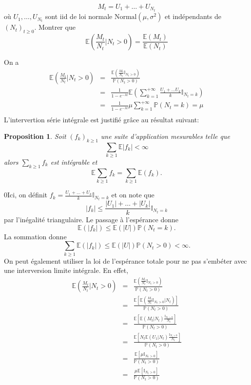 \documentclass[11pts]{exam}
\newcommand*{\Prob}{\mathbb{P}}
\newcommand*{\E}{\mathbb{E}}
\newtheorem{prop}{Proposition}
\newcommand*{\ind}{\mathbb{I}}
\begin{document}
\begin{questions}
\begin{parts}
$$
M_t = U_1+\ldots+  U_{N_t}
$$
où $U_1,\ldots, U_{N_t}$ sont iid de loi normale $\text{Normal}(\mu ,\sigma^2 )$ et indépendants de $(N_t)_{t\geq 0}$. Montrer que 
$$
\mathbb{E}\left(\frac{M_t}{N_t}\Big\rvert N_t>0\right) = \frac{\mathbb{E}(M_t)}{\mathbb{E}(N_t)}
$$
\begin{solution}
On a 
\begin{eqnarray*}
\mathbb{E}\left(\frac{M_t}{N_t}\Big\rvert N_t>0\right)&=& \frac{\mathbb{E}\left(\frac{M_t}{N_t}\mathbb{I}_{N_t>0}\right)}{\mathbb{P}(N_t>0)}\\
&=&\frac{1}{1-e^{-\lambda t}}\mathbb{E}\left(\sum_{k = 1}^{+\infty}\frac{U_1+\ldots U_k}{k}\mathbb{I}_{N_t=k}\right)\\
&=&\frac{1}{1-e^{-\lambda t}}\mu\sum_{k = 1}^{+\infty}\mathbb{P}(N_t=k)=\mu\\
\end{eqnarray*}
L'intervertion série intégrale est justifié grâce au résultat suivant:
\begin{prop}
Soit $(f_k)_{k\geq 1}$ une suite d'application mesurables telle que 
$$
\sum_{k\geq 1}\E|f_k|<\infty
$$
alors $\sum_{k\geq 1}f_k$ est intégrable et 
$$
\E\sum_{k\geq 1}f_k=\sum_{k\geq1}\E(f_k).
$$
\end{prop}
0Ici, on définit $f_k = \frac{U_1+\ldots+ U_k}{k}\ind_{N_t = k}$ et on note que 
$$
|f_k|\leq\frac{|U_1|+\ldots+ |U_k|}{k}\ind_{N_t = k}
$$
par l'inégalité triangulaire. Le passage à l'espérance donne 
$$
\E(|f_k|)\leq\E(|U|)\Prob(N_t = k).
$$
La sommation donne 
$$
\sum_{k\geq 1}\E(|f_k|)\leq\E(|U|)\Prob(N_t > 0)<\infty.
$$
On peut également utiliser la loi de l'espérance totale pour ne pas s'embéter avec une interversion limite intégrale. En effet, 
\begin{eqnarray*}
\mathbb{E}\left(\frac{M_t}{N_t}\Big\rvert N_t>0\right)&=& \frac{\mathbb{E}\left(\frac{M_t}{N_t}\mathbb{I}_{N_t>0}\right)}{\mathbb{P}(N_t>0)}\\
&=&\frac{\mathbb{E}\left[\mathbb{E}\left(\frac{M_t}{N_t}\mathbb{I}_{N_t>0}|N_t\right)\right]}{\mathbb{P}(N_t>0)}\\
&=&\frac{\mathbb{E}\left[\mathbb{E}\left(M_t|N_t\right)\frac{\mathbb{I}_{N_t>0}}{N_t}\right]}{\mathbb{P}(N_t>0)}\\
&=&\frac{\mathbb{E}\left[N_t\mathbb{E}\left(U_1|N_t\right)\frac{\mathbb{I}_{N_t>0}}{N_t}\right]}{\mathbb{P}(N_t>0)}\\
&=&\frac{\mathbb{E}\left[\mu\mathbb{I}_{N_t>0}\right]}{\mathbb{P}(N_t>0)}\\
&=&\frac{\mu\mathbb{E}\left[\mathbb{I}_{N_t>0}\right]}{\mathbb{P}(N_t>0)}\\

\end{eqnarray*}
\end{solution}
\end{parts}
\end{questions}
\end{document}
